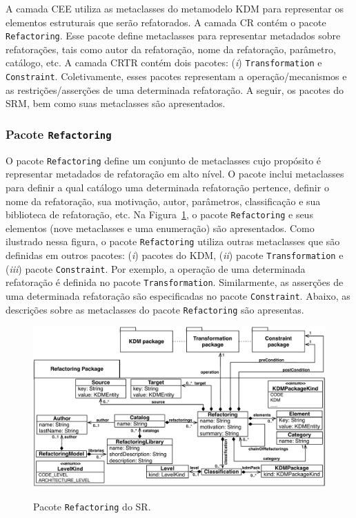 A camada CEE utiliza as metaclasses do metamodelo KDM para representar os elementos estruturais que serão refatorados. A camada CR contém o pacote \texttt{Refactoring}. Esse pacote define metaclasses para representar metadados sobre refatorações, tais como autor da refatoração, nome da refatoração, parâmetro, catálogo, etc. A camada CRTR contém dois pacotes: (\textit{i})  \texttt{Transformation} e \texttt{Constraint}. Coletivamente, esses pacotes representam a operação/mecanismos e as restrições/asserções de uma determinada refatoração. A seguir, os pacotes do SRM, bem como suas metaclasses são apresentados.

\subsubsection{Pacote \texttt{Refactoring}}

O pacote \texttt{Refactoring} define um conjunto de metaclasses cujo propósito é representar metadados de refatoração em alto nível. O pacote inclui metaclasses para definir a qual catálogo uma determinada refatoração pertence, definir o nome da refatoração, sua motivação, autor, parâmetros, classificação e sua biblioteca de refatoração, etc. Na Figura~\ref{fig:pacote_refactoring_srm}, o pacote \texttt{Refactoring} e seus elementos (nove metaclasses e uma enumeração) são apresentados. Como ilustrado nessa figura, o pacote \texttt{Refactoring} utiliza outras metaclasses que são definidas em outros pacotes: (\textit{i}) pacotes do KDM, (\textit{ii}) pacote \texttt{Transformation} e (\textit{iii}) pacote \texttt{Constraint}. Por exemplo, a operação de uma determinada refatoração é definida no pacote \texttt{Transformation}. Similarmente, as asserções de uma determinada refatoração são especificadas no pacote \texttt{Constraint}. Abaixo, as descrições sobre as metaclasses do pacote \texttt{Refactoring} são apresentas. 

\begin{figure}[h]
	\centering
		\caption{Pacote \texttt{Refactoring} do SR.}
	\includegraphics[scale=0.70]{images/newRefactoringPackageSRM}
	\label{fig:pacote_refactoring_srm}
	\fautor
\end{figure}

